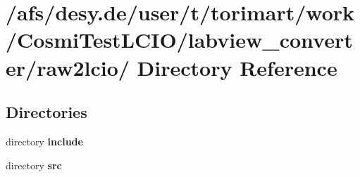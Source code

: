 \section{/afs/desy.de/user/t/torimart/work/CosmiTestLCIO/labview\_\-converter/raw2lcio/ Directory Reference}
\label{dir_3900b01e79db89eeef685b93f5dff5d9}
\subsection*{Directories}
\begin{DoxyCompactItemize}
\item 
directory {\bf include}
\item 
directory {\bf src}
\end{DoxyCompactItemize}
